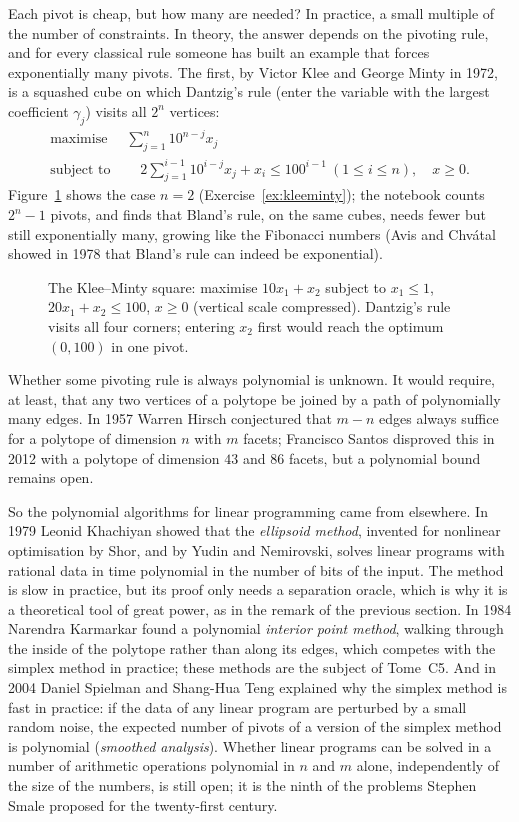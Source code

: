 Each pivot is cheap, but how many are needed? In practice, a small multiple of the number of constraints. In theory, the answer depends on the pivoting rule, and for every classical rule someone has built an example that forces exponentially many pivots. The first,
by Victor Klee and George Minty in 1972, is a squashed cube on which Dantzig's rule (enter the variable with the largest coefficient $\gamma_j$) visits all $2^n$ vertices:
\[
\begin{aligned}
\text{maximise }&\sum_{j=1}^n10^{n-j}x_j\\
\text{subject to }&\quad 2\sum_{j=1}^{i-1}10^{i-j}x_j+x_i\le100^{i-1}\ (1\le i\le n),\quad x\ge0.
\end{aligned}
\]
Figure~\ref{fig:kleeminty} shows the case $n=2$ (Exercise~\ref{ex:kleeminty}); the notebook counts $2^n-1$ pivots, and finds that Bland's rule, on the same cubes, needs fewer but still exponentially many, growing like the Fibonacci numbers (Avis and Chv\'atal showed in 1978 that Bland's rule can indeed be exponential).

\begin{figure}[ht]
\centering
{}
\caption{The Klee--Minty square: maximise $10x_1+x_2$ subject to $x_1\le1$, $20x_1+x_2\le100$, $x\ge0$ (vertical scale compressed). Dantzig's rule visits all four corners; entering $x_2$ first would reach the optimum $(0,100)$ in one pivot.}
\label{fig:kleeminty}
\end{figure}

Whether some pivoting rule is always polynomial is unknown. It would require, at least, that any two vertices of a polytope be joined by a path of polynomially many edges. In 1957 Warren Hirsch conjectured that $m-n$ edges always suffice for a polytope of dimension $n$
with $m$ facets; Francisco Santos disproved this in 2012 with a polytope of dimension $43$ and $86$ facets, but a polynomial bound remains open.

So the polynomial algorithms for linear programming came from elsewhere. In 1979 Leonid Khachiyan showed that the \emph{ellipsoid method}, invented for nonlinear optimisation by Shor, and by Yudin and Nemirovski, solves linear programs with rational data in time polynomial
in the number of bits of the input. The method is slow in practice, but its proof only needs a separation oracle, which is why it is a theoretical tool of great power, as in the remark of the previous section. In 1984 Narendra Karmarkar
found a polynomial \emph{interior point method}, walking through the inside of the polytope rather than along its edges, which competes with the simplex method in practice; these methods are the subject of Tome~C5. And in 2004 Daniel Spielman and Shang-Hua Teng
explained why the simplex method is fast in practice: if the data of any linear program are perturbed by a small random noise, the expected number of pivots of a version of the simplex method is polynomial (\emph{smoothed analysis}). Whether linear programs can be
solved in a number of arithmetic operations polynomial in $n$ and $m$ alone, independently of the size of the numbers, is still open; it is the ninth of the problems Stephen Smale proposed for the twenty-first century.

